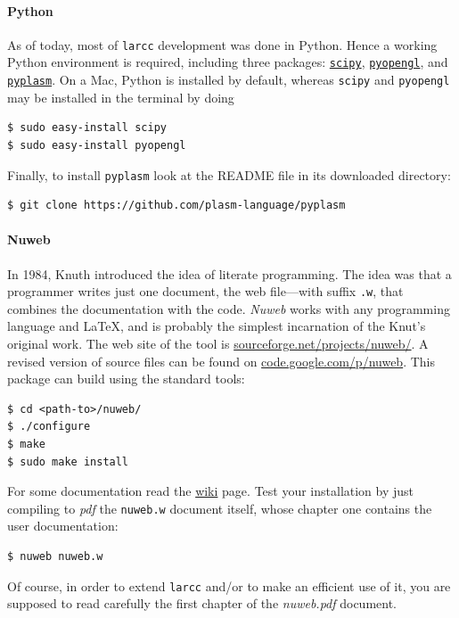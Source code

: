 \paragraph{Python}
As of today, most of \texttt{larcc} development was done in Python. Hence a working Python environment is required, including three packages: \href{http://www.scipy.org}{\texttt{scipy}}, \href{http://pyopengl.sourceforge.net}{\texttt{pyopengl}}, and \href{https://github.com/plasm-language/pyplasm}{\texttt{pyplasm}}. On a Mac, Python is installed by default, whereas \texttt{scipy} and \texttt{pyopengl} may be installed in the terminal by doing 
\begin{verbatim}
$ sudo easy-install scipy
$ sudo easy-install pyopengl
\end{verbatim}
Finally, to install \texttt{pyplasm} look at the README file in its downloaded directory:
\begin{verbatim}
$ git clone https://github.com/plasm-language/pyplasm
\end{verbatim}

\paragraph{Nuweb}

In 1984, Knuth introduced the idea of literate programming. The idea was that a programmer writes just one document, the web file---with suffix \texttt{.w}, that combines the documentation with the code. \emph{Nuweb} works with any programming language and \LaTeX, and is probably the simplest incarnation of the Knut's original work.
The web site of the tool is \href{http://sourceforge.net/projects/nuweb/}{sourceforge.net/projects/nuweb/}.
A revised version of source files can be found on \href{https://code.google.com/p/nuweb/downloads/list}{code.google.com/p/nuweb}. This package can build using the standard tools:
\begin{verbatim}
$ cd <path-to>/nuweb/
$ ./configure
$ make
$ sudo make install
\end{verbatim}
For some documentation read the \href{https://code.google.com/p/nuweb/source/browse/branches/qse-nuweb/README?r=3}{wiki} page.  Test your installation by just compiling to \emph{pdf} the \texttt{nuweb.w} document itself, whose chapter one contains the user documentation:
\begin{verbatim}
$ nuweb nuweb.w
\end{verbatim}
Of course, in order to extend \texttt{larcc} and/or to make an efficient use of it, you are supposed to read carefully the first chapter of the \emph{nuweb.pdf} document.

